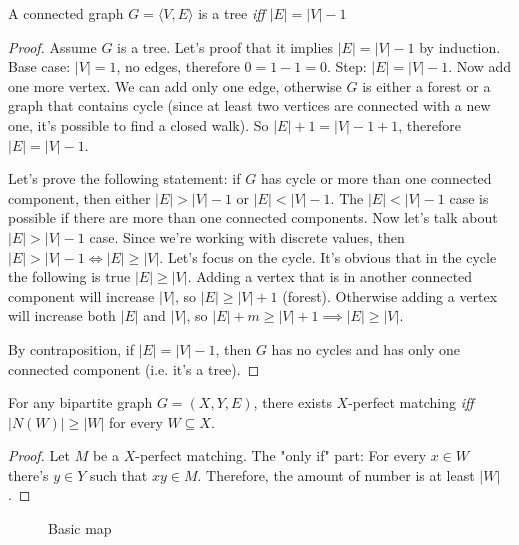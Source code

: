 \documentclass[12pt, a4paper]{article}
\begin{document}
\begin{theorem}[Tree]
A connected graph \(G = \langle V, E \rangle\) is a tree \textit{iff} \(|E| = |V| - 1\)
\end{theorem}

\begin{proof}
Assume \(G\) is a tree. Let's proof that it implies \(|E| = |V| - 1\) by
induction. Base case: \(|V| = 1\), no edges, therefore \(0 = 1 - 1 = 0\). Step:
\(|E| = |V| - 1\). Now add one more vertex. We can add only one edge, otherwise
\(G\) is either a forest or a graph that contains cycle (since at least two
vertices are connected with a new one, it's possible to find a closed walk). So
\(|E| + 1 = |V| - 1 + 1\), therefore \(|E| = |V| - 1\).

Let's prove the following statement: if \(G\) has cycle or more than one
  connected component, then either \(|E| > |V| - 1\) or \(|E| < |V| - 1\).
The \(|E| < |V| - 1\) case is possible if there are more than one connected components.
Now let's talk about \(|E| > |V| - 1\) case. Since we're working with discrete values, then \(|E| > |V| - 1 \iff |E| \ge |V|\).
Let's focus on the cycle. It's obvious that in the cycle the following is true \(|E| \ge |V|\).
Adding a vertex that is in another connected component will increase \(|V|\), so \(|E| \ge |V| + 1\) (forest).
Otherwise adding a vertex will increase both \(|E|\) and \(|V|\), so \(|E| + m \ge |V| + 1 \implies |E| \ge |V|\).

By contraposition, if \(|E| = |V| - 1\), then \(G\) has no cycles and has only one connected component (i.e. it's a tree).
\end{proof}

\begin{theorem}[Hall]
For any bipartite graph \(G = (X, Y, E)\), there exists \(X\)-perfect matching
\textit{iff} \(|N(W)| \ge |W|\) for every \(W \subseteq X\).
\end{theorem}

\begin{proof}
Let \(M\) be a \(X\)-perfect matching.
The "only if" part: For every \(x \in W\) there's \(y \in Y\) such that \(xy \in M\).
Therefore, the amount of number is at least \(|W|\).
\end{proof}


\begin{landscape}
\begin{figure}
\centering

\caption{Basic map}\label{fig:map_basic}
\end{figure}
\end{landscape}
\end{document}
